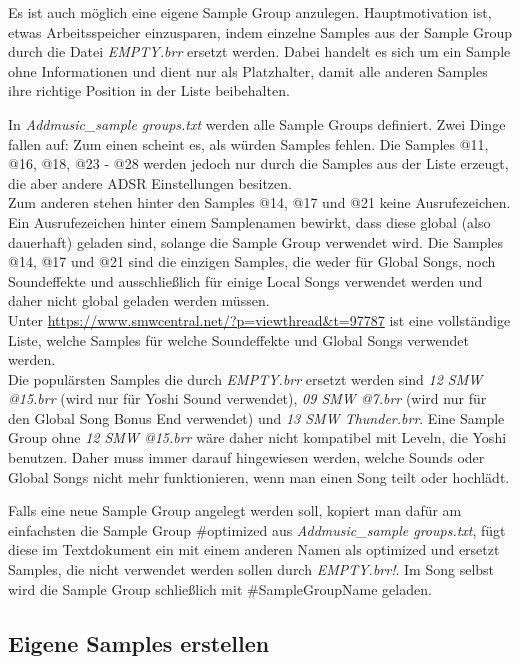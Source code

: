 Es ist auch möglich eine eigene Sample Group anzulegen. Hauptmotivation ist, etwas Arbeitsspeicher einzusparen, indem einzelne Samples aus der Sample Group durch die Datei \textit{EMPTY.brr} ersetzt werden. Dabei handelt es sich um ein Sample ohne Informationen und dient nur als Platzhalter, damit alle anderen Samples ihre richtige Position in der Liste beibehalten.

\bigskip

In \textit{Addmusic\_sample groups.txt} werden alle Sample Groups definiert. Zwei Dinge fallen auf: Zum einen scheint es, als würden Samples fehlen. Die Samples @11, @16, @18, @23 - @28 werden jedoch nur durch die Samples aus der Liste erzeugt, die aber andere ADSR Einstellungen besitzen. \\

Zum anderen stehen hinter den Samples @14, @17 und @21 keine Ausrufezeichen. Ein Ausrufezeichen hinter einem Samplenamen bewirkt, dass diese global (also dauerhaft) geladen sind, solange die Sample Group verwendet wird. Die Samples @14, @17 und @21 sind die einzigen Samples, die weder für Global Songs, noch Soundeffekte und ausschließlich für einige Local Songs verwendet werden und daher nicht global geladen werden müssen. \\
Unter \href{https://www.smwcentral.net/?p=viewthread\&t=97787}{https://www.smwcentral.net/?p=viewthread\&t=97787} ist eine vollständige Liste, welche Samples für welche Soundeffekte und Global Songs verwendet werden. \\
Die populärsten Samples die durch \textit{EMPTY.brr} ersetzt werden sind \textit{12 SMW @15.brr} (wird nur für Yoshi Sound verwendet), \textit{09 SMW @7.brr} (wird nur für den Global Song Bonus End verwendet) und \textit{13 SMW Thunder.brr}. Eine Sample Group ohne \textit{12 SMW @15.brr} wäre daher nicht kompatibel mit Leveln, die Yoshi benutzen. Daher muss immer darauf hingewiesen werden, welche Sounds oder Global Songs nicht mehr funktionieren, wenn man einen Song teilt oder hochlädt.

\bigskip

Falls eine neue Sample Group angelegt werden soll, kopiert man dafür am einfachsten die Sample Group \#optimized aus \textit{Addmusic\_sample groups.txt}, fügt diese im Textdokument ein mit einem anderen Namen als optimized und ersetzt Samples, die nicht verwendet werden sollen durch \textit{\dq EMPTY.brr\dq{}!}. Im Song selbst wird die Sample Group schließlich mit \#SampleGroupName geladen.

\subsection{Eigene Samples erstellen}
